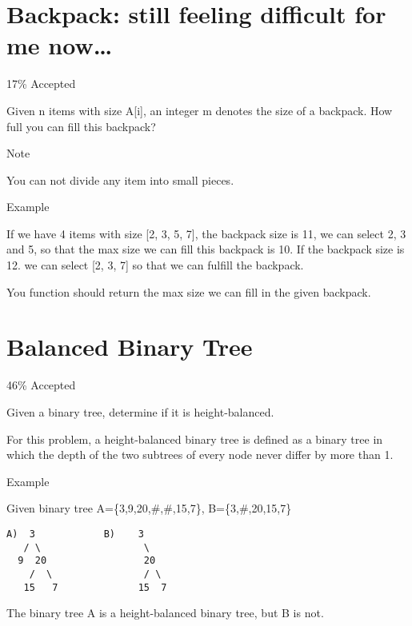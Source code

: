 \documentclass[12pt]{book}
\begin{document}
\chapter{Backpack: still feeling difficult for me now\ldots{}}
\label{sec-7}

17\% Accepted

Given n items with size A[i], an integer m denotes the size of a backpack. How full you can fill this backpack? 

Note

You can not divide any item into small pieces.

Example

If we have 4 items with size [2, 3, 5, 7], the backpack size is 11, we can select 2, 3 and 5, so that the max size we can fill this backpack is 10. If the backpack size is 12. we can select [2, 3, 7] so that we can fulfill the backpack.

You function should return the max size we can fill in the given backpack.
\chapter{Balanced Binary Tree}
\label{sec-8}

46\% Accepted

Given a binary tree, determine if it is height-balanced.

For this problem, a height-balanced binary tree is defined as a binary tree in which the depth of the two subtrees of every node never differ by more than 1.

Example

Given binary tree A=\{3,9,20,\#,\#,15,7\}, B=\{3,\#,20,15,7\}
\lstset{language=java,label= ,caption= ,numbers=none}
\begin{lstlisting}
A)  3            B)    3 
   / \                  \
  9  20                 20
    /  \                / \
   15   7              15  7
\end{lstlisting}

The binary tree A is a height-balanced binary tree, but B is not.
\end{document}
